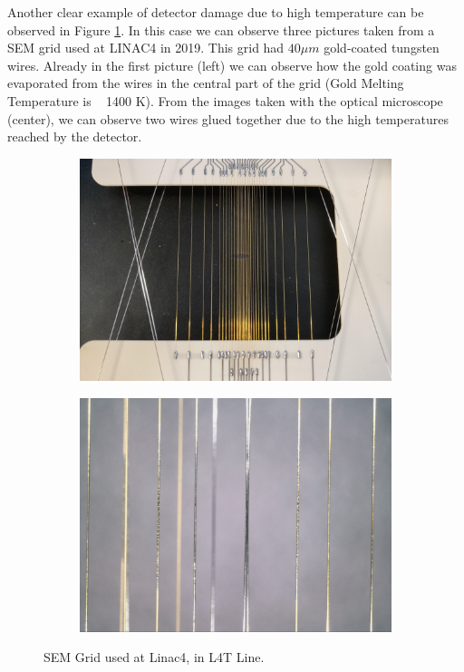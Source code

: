 Another clear example of detector damage due to high temperature can be observed in Figure \ref{fig:SEMLinac4damage}. In this case we can observe three pictures taken from a SEM grid used at LINAC4 in 2019. This grid had $40 \mu m$ gold-coated tungsten wires. Already in the first picture (left) we can observe how the gold coating was evaporated from the wires in the central part of the grid (Gold Melting Temperature is ~ 1400 K). From the images taken with the optical microscope (center), we can observe two wires glued together due to the high temperatures reached by the detector. 

\begin{figure}[h]
    \centering
    \begin{subfigure}[b]{0.42\textwidth}
        \includegraphics[width=\textwidth]{SEMgridDamage/GridDamage1.jpg}
    \end{subfigure}
    \hspace{0.5cm}
    \begin{subfigure}[b]{0.4\textwidth}
        \includegraphics[width=\textwidth]{SEMgridDamage/GridDamage2.png}
    \end{subfigure}
    \caption{SEM Grid used at Linac4, in L4T Line.  }
    \label{fig:SEMLinac4damage}
\end{figure}

